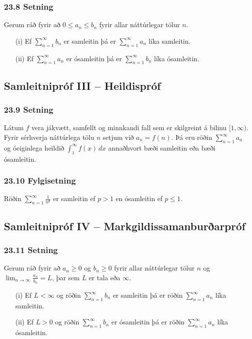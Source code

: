  \subsubsection{23.8 Setning} 
Gerum ráð fyrir að $0\leq a_n\leq b_n$ fyrir allar náttúrlegar tölur
$n$.  \pause

\begin{itemize}
\item[(i)]  Ef $\sum_{n=1}^\infty b_n$ er samleitin þá er 
$\sum_{n=1}^\infty a_n$ líka samleitin. \pause
\item[(ii)]  Ef $\sum_{n=1}^\infty a_n$ er ósamleitin þá er 
$\sum_{n=1}^\infty b_n$ líka ósamleitin.
 \end{itemize}



\subsection[t]{Samleitnipróf III -- Heildispróf}
 \subsubsection{23.9 Setning}
Látum $f$ vera jákvætt, samfellt og minnkandi fall sem er skilgreint á
bilinu $[1, \infty)$. \pause  Fyrir sérhverja náttúrlega tölu $n$ setjum við
$a_n=f(n)$. \pause Þá eru röðin $\sum_{n=1}^\infty a_n$ og óeiginlega
heildið $\int_1^\infty f(x)\,dx$ annaðhvort bæði samleitin eða bæði
ósamleitin. 
 

 \subsubsection{23.10 Fylgisetning}
Röðin $\sum_{n=1}^\infty\frac{1}{n^{p}}$ er samleitin ef $p>1$ en 
ósamleitin ef
$p\leq 1$.
 


\subsection[t]{Samleitnipróf IV -- Markgildissamanburðarpróf}
 \subsubsection{23.11 Setning}
Gerum ráð fyrir að $a_n\geq 0$ og $b_n\geq 0$ fyrir allar náttúrlegar
tölur $n$ og $\lim_{n\rightarrow\infty}\frac{a_n}{b_n}=L$, þar sem
$L$ er tala eða $\infty$. \pause

\begin{itemize}
\item[(i)] Ef $L<\infty$ og  röðin 
$\sum_{n=1}^\infty b_n$ er samleitin þá er 
röðin $\sum_{n=1}^\infty a_n$ líka samleitin. \pause
\item[(ii)] Ef $L>0$ og  röðin 
$\sum_{n=1}^\infty b_n$ er ósamleitin þá er 
röðin $\sum_{n=1}^\infty a_n$ líka ósamleitin.
\end{itemize}
 




